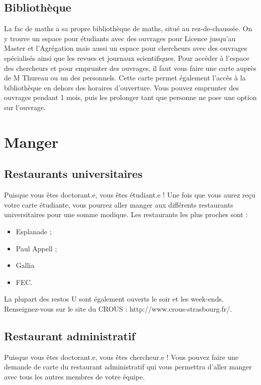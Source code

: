 \documentclass[a5paper]{article}
\begin{document}
\subsection{Bibliothèque}
\label{sec:biblio}

La fac de maths a sa propre bibliothèque de maths, situé au rez-de-chaussée. On y trouve un espace pour étudiants avec des ouvrages pour Licence jusqu'au Master et l'Agrégation mais aussi un espace pour chercheurs avec des ouvrages spécialisés ainsi que les revues et journaux scientifiques. Pour accéder à l'espace des chercheurs et pour emprunter des ouvrages, il faut vous faire une carte auprès de M Thureau ou un des personnels. Cette carte permet également l'accès à la bibliothèque en dehors des horaires d'ouverture.
Vous pouvez emprunter des ouvrages pendant 1 mois, puis les prolonger tant que personne ne pose une option sur l'ouvrage.


\section{Manger}
\label{sec:manger}

\subsection{Restaurants universitaires}
\label{sec:rest-univ}
Puisque vous êtes doctorant.e, vous êtes étudiant.e ! Une fois que
vous aurez reçu votre carte étudiante, vous pourrez
aller manger aux différents restaurants universitaires pour une somme
modique. Les restaurants les plus proches sont :
\begin{itemize}
\item Esplanade ;
\item Paul Appell ;
\item Gallia
\item FEC.
\end{itemize}

La plupart des restos U sont également ouverts le soir et les week-ends. Renseignez-vous sur le site du CROUS : http://www.crous-strasbourg.fr/.


\subsection{Restaurant administratif}
\label{subsec:rest-admin}
Puisque vous êtes doctorant.e, vous êtes chercheur.e ! Vous pouvez
faire une demande de carte du restaurant administratif qui vous
permettra d'aller manger avec tous les autres membres de votre équipe.
\end{document}
